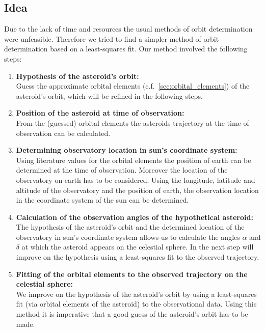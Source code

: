 \documentclass[11pt, a4paper]{article}
\numberwithin{equation}{section}
\begin{document}
\subsection{Idea}
Due to the lack of time and resources the usual methods of orbit determination were unfeasible.
Therefore we tried to find a simpler method of orbit determination based on a least-squares fit.
Our method involved the following steps:
\begin{enumerate}
	\item \textbf{Hypothesis of the asteroid's orbit:}\\
	Guess the approximate orbital elements (c.f.\ \ref{sec:orbital_elements}) of the asteroid's orbit, which will be refined in the following steps.
	
	\item \textbf{Position of the asteroid at time of observation:}\\
	From the (guessed) orbital elements the asteroids trajectory at the time of observation can be calculated.
	
	\item \textbf{Determining observatory location in sun's coordinate system:}\\
	Using literature values for the orbital elements the position of earth can be determined at the time of observation.
	Moreover the location of the observatory on earth has to be considered.
	Using the longitude, latitude and altitude of the observatory and the position of earth, the observation location in the coordinate system of the sun can be determined.
	
	\item \textbf{Calculation of the observation angles of the hypothetical asteroid:}\\
	The hypothesis of the asteroid's orbit and the determined location of the observatory in sun's coordinate system allows us to calculate the angles $\alpha$ and $\delta$ at which the asteroid appears on the celestial sphere. In the next step will improve on the hypothesis using a least-squares fit to the observed trajectory.
	
	\item \textbf{Fitting of the orbital elements to the observed trajectory on the celestial sphere:}\\
	We improve on the hypothesis of the asteroid's orbit by using a least-squares fit (via orbital elements of the asteroid) to the observational data. Using this method it is imperative that a good guess of the asteroid's orbit has to be made.	
\end{enumerate}
\end{document}
